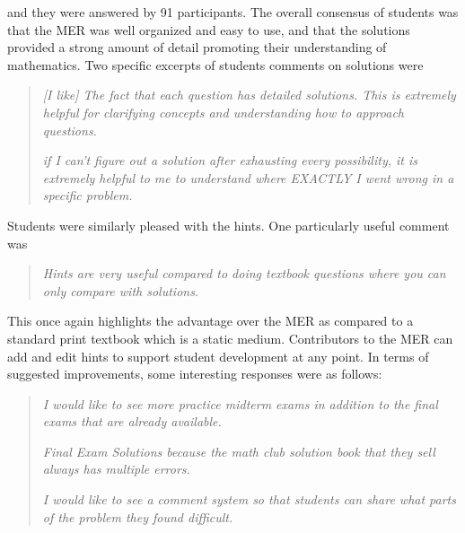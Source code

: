 \documentclass{primus}
\begin{document}
\noindent{}and they were answered by 91 participants.  The overall consensus of students was that the MER was well organized and easy to use, and that the solutions provided a strong amount of detail promoting their understanding of mathematics.  Two specific excerpts of students comments on solutions were

\begin{quote}
\textit{[I like] The fact that each question has detailed solutions. This is extremely helpful for clarifying concepts and understanding how to approach questions.}

\textit{if I can't figure out a solution after exhausting every possibility, it is extremely helpful to me to understand where EXACTLY I went wrong in a specific problem.}
\end{quote}

\noindent{}Students were similarly pleased with the hints.  One particularly useful comment was

\begin{quote}
\textit{Hints are very useful compared to doing textbook questions where you can only compare with solutions.}
\end{quote}

\noindent{}This once again highlights the advantage over the MER as compared to a standard print textbook which is a static medium.  Contributors to the MER can add and edit hints to support student development at any point.  In terms of suggested improvements, some interesting responses were as follows:

\begin{quote}
\textit{I would like to see more practice midterm exams in addition to the final exams that are already available.}

\textit{Final Exam Solutions because the math club solution book that they sell always has multiple errors.}

\textit{I would like to see a comment system so that students can share what parts of the problem they found difficult.}
\end{quote}
\end{document}
